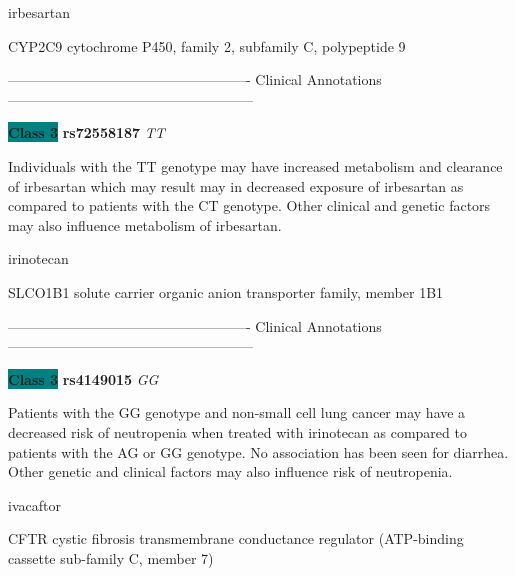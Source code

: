 \documentclass{resume} %
\begin{document}
\begin{rSection}{ irbesartan }
\begin{rSubsection}{ CYP2C9 }{ cytochrome P450, family 2, subfamily C, polypeptide 9 }{}{}
\item[]

\item[] ---------------------------------------------------- Clinical Annotations -----------------------------------------------------\newline
\item \textbf{\colorbox{teal} {Class 3}} \textbf{ rs72558187 } \textit{ TT }
\item[] Individuals with the TT genotype may have increased metabolism and clearance of irbesartan which may result may in decreased exposure of irbesartan as compared to patients with the CT genotype. Other clinical and genetic factors may also influence metabolism of irbesartan.
\end{rSubsection}

\end{rSection}\begin{rSection}{ irinotecan }
\item[]

\begin{rSubsection}{ SLCO1B1 }{ solute carrier organic anion transporter family, member 1B1 }{}{}
\item[]

\item[] ---------------------------------------------------- Clinical Annotations -----------------------------------------------------\newline
\item \textbf{\colorbox{teal} {Class 3}} \textbf{ rs4149015 } \textit{ GG }
\item[] Patients with the GG genotype and non-small cell lung cancer may have a decreased risk of neutropenia when treated with irinotecan as compared to patients with the AG or GG genotype. No association has been seen for diarrhea. Other genetic and clinical factors may also influence risk of neutropenia.
\end{rSubsection}

\end{rSection}\begin{rSection}{ ivacaftor }
\item[]

\begin{rSubsection}{ CFTR }{ cystic fibrosis transmembrane conductance regulator (ATP-binding cassette sub-family C, member 7) }{}{}
\item[]


\end{rSubsection}
\end{rSection}
\end{document}
